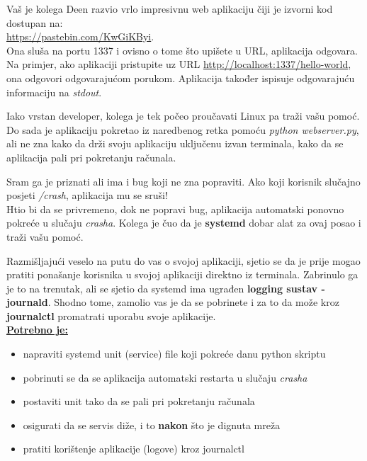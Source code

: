 \documentclass[12pt,a4paper]{article}
\begin{document}
Vaš je kolega Deen razvio vrlo impresivnu web aplikaciju čiji je izvorni kod dostupan na: \\ \url{https://pastebin.com/KwGiKByi}. \\
Ona sluša na portu 1337 i ovisno o tome što upišete u URL, aplikacija odgovara. \\
Na primjer, ako aplikaciji pristupite uz URL \url{http://localhost:1337/hello-world}, ona odgovori odgovarajućom porukom.
Aplikacija također ispisuje odgovarajuću informaciju na \textit{stdout}. \\ \par
Iako vrstan developer, kolega je tek počeo proučavati Linux pa traži vašu pomoć.
Do sada je aplikaciju pokretao iz naredbenog retka pomoću \textit{python webserver.py},
ali ne zna kako da drži svoju aplikaciju uključenu izvan terminala, kako da se aplikacija pali pri pokretanju računala. \\ \par
Sram ga je priznati ali ima i bug koji ne zna popraviti. Ako koji korisnik slučajno posjeti \textit{/crash}, aplikacija mu se sruši! \\
Htio bi da se privremeno, dok ne popravi bug, aplikacija automatski ponovno pokreće u slučaju \textit{crasha}. 
Kolega je čuo da je \textbf{systemd} dobar alat za ovaj posao i traži vašu pomoć. \\ \par
Razmišljajući veselo na putu do vas o svojoj aplikaciji, sjetio se da je prije mogao pratiti ponašanje korisnika u svojoj aplikaciji direktno iz terminala.
Zabrinulo ga je to na trenutak, ali se sjetio da systemd ima ugrađen \textbf{logging sustav - journald}. Shodno tome, zamolio vas je da se pobrinete i za to da može kroz \textbf{journalctl} promatrati uporabu svoje aplikacije. \\

\underline{\textbf{Potrebno je:}}
\begin{itemize}
	\item napraviti systemd unit (service) file koji pokreće danu python skriptu
	\item pobrinuti se da se aplikacija automatski restarta u slučaju \textit{crasha}
	\item postaviti unit tako da se pali pri pokretanju računala
  \item osigurati da se servis diže, i to \textbf{nakon} što je dignuta mreža
	\item pratiti korištenje aplikacije (logove) kroz journalctl
\end{itemize}
\end{document}
